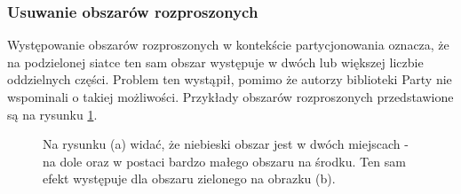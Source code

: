 \subsubsection{Usuwanie obszarów rozproszonych}
Występowanie obszarów rozproszonych w kontekście partycjonowania oznacza, że na podzielonej siatce ten sam obszar
występuje w dwóch lub większej liczbie oddzielnych części.
Problem ten wystąpił, pomimo że autorzy biblioteki Party nie wspominali o takiej możliwości.
Przykłady obszarów rozproszonych przedstawione są na rysunku \ref{im:noises}.

\begin{figure}[h]
\begin{subfigure}{.5\textwidth}
    \centering
    \caption[short]{}
\end{subfigure}
\begin{subfigure}{.5\textwidth}
    \centering
    \caption[short]{}
\end{subfigure}%
\caption{Na rysunku (a) widać, że niebieski obszar jest w dwóch miejscach - na dole oraz w postaci bardzo małego obszaru na środku.
Ten sam efekt występuje dla obszaru zielonego na obrazku (b).}
\label{im:noises}
\end{figure}

